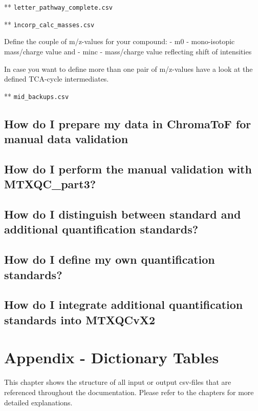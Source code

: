 \documentclass[]{book}
\begin{document}
** \texttt{letter\_pathway\_complete.csv}

** \texttt{ìncorp\_calc\_masses.csv}

Define the couple of m/z-values for your compound:
- m0 - mono-isotopic mass/charge value and
- minc - mass/charge value reflecting shift of intensities

In case you want to define more than one pair of m/z-values have a look at the defined TCA-cycle intermediates.

** \texttt{mid\_backups.csv}

\hypertarget{howmanval-chroma}{%
\section{How do I prepare my data in ChromaToF for manual data validation}\label{howmanval-chroma}}

\hypertarget{howmanval-part3}{%
\section{How do I perform the manual validation with MTXQC\_part3?}\label{howmanval-part3}}

\hypertarget{quantquant}{%
\section{How do I distinguish between standard and additional quantification standards?}\label{quantquant}}

\hypertarget{quantind}{%
\section{How do I define my own quantification standards?}\label{quantind}}

\hypertarget{addqadds}{%
\section{How do I integrate additional quantification standards into MTXQCvX2}\label{addqadds}}

\hypertarget{tables}{%
\chapter{Appendix - Dictionary Tables}\label{tables}}

This chapter shows the structure of all input or output csv-files that are referenced throughout the documentation. Please refer to the chapters for more detailed explanations.
\end{document}
